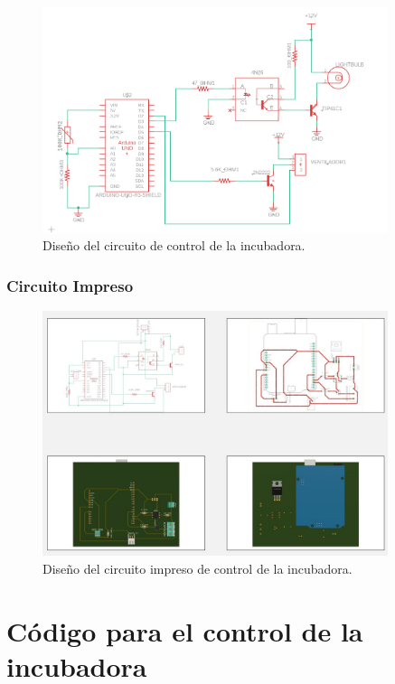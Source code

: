 \documentclass[spanish, a4paper, 11pt]{article}
\begin{document}
\begin{figure}[ht]
    \centering
    \includegraphics[width=0.9\textwidth]{./figures/Circuito.png}
    \caption{Diseño del circuito de control de la incubadora.}
\end{figure}
\FloatBarrier

\newpage

\subsubsection{Circuito Impreso}

\begin{figure}[ht]
    \centering
    \includegraphics[width=0.9\textwidth]{./figures/PCB.png}
    \caption{Diseño del circuito impreso de control de la incubadora.}
\end{figure}
\FloatBarrier

\section{Código para el control de la incubadora}
\end{document}
